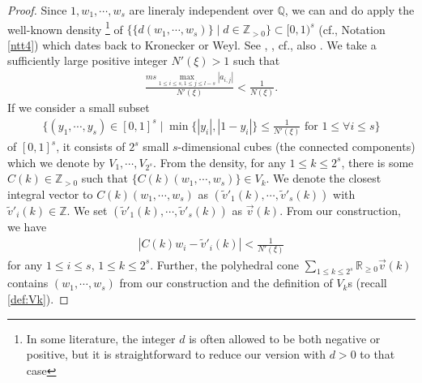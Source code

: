 \documentclass[12pt,a4paper]{amsart}
\theoremstyle{remark}
\theoremstyle{definition}
\def\R{\mathbb{R}}
\def\Z{\mathbb{Z}}
\begin{document}
\begin{proof}
Since $1, w_1, \cdots , w_s$ are lineraly independent over $\mathbb{Q}$, we can and do apply the well-known density 
\footnote{In some literature, the integer $d$ is often allowed to be both negative or positive, but 
it is straightforward to reduce our version with $d>0$ 
to that case}
of $\{\{d(w_1,\cdots,w_s)\}\mid d\in \Z_{>0}\}\subset [0,1)^s$ (cf., Notation \ref{ntt4}) 
which dates back to Kronecker or Weyl. See \cite{Kronecker}, 
\cite{Weyl}, cf., also \cite[Appendix A]{Hum}. 
We take a sufficiently large positive integer $N'(\xi)>1$ 
such that 
\begin{align}\label{def:N'}
\frac{ms \underset{1\le i\le s,1\le j\le l-s}\max|a_{i,j}|}
{ N'(\xi)}<\frac{1}{N(\xi)}. 
\end{align}
If we consider a small subset 
\begin{align}\label{def:Vk}
\{(y_1,\cdots,y_s)\in [0,1]^s\mid \min\{|y_i|,|1-y_i|\}\le \frac{1}{N'(\xi)} 
\text{ for }1\le \forall i\le s\}
\end{align}
of $[0,1]^s$, it consists of $2^s$ small $s$-dimensional 
cubes (the connected components) 
which we denote by $V_1,\cdots, V_{2^s}$. 
From the density, for any $1\le k\le 2^s$, there is some 
$C(k)\in \Z_{>0}$ such that 
$\{C(k)(w_1,\cdots,w_s)\}\in V_k$. We denote the closest integral vector to 
$C(k)(w_1,\cdots,w_s)$ as $(\tilde{v}'_1(k),\cdots,\tilde{v}'_s(k))$ 
with $\tilde{v}'_i(k)\in \Z$. 
We set $(\tilde{v}'_1(k), \cdots,\tilde{v}'_s(k))$ as $\vec{v}(k)$. 
From our construction, we have 
\begin{align}\label{ckvi}
|C(k)w_i-\tilde{v}'_i(k)|<\frac{1}{N'(\xi)}    
\end{align}
for any $1\le i\le s$, $1\le k\le 2^s$. 
Further, the polyhedral cone 
$\sum_{1\le k\le 2^s} \R_{\ge 0}\vec{v}(k)$ contains $(w_1,\cdots,w_s)$ from our construction 
and the definition of $V_k$s (recall \eqref{def:Vk}). 


\end{proof}
\end{document}

